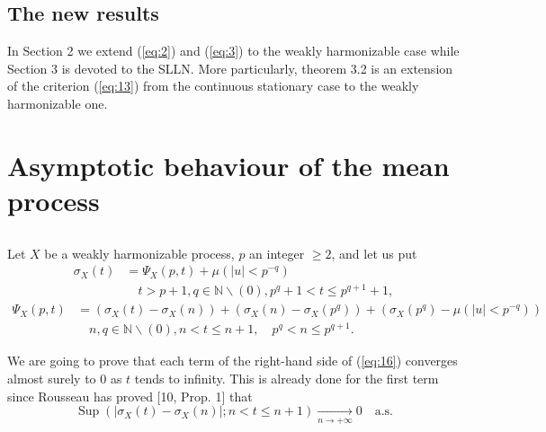 \documentclass{article}
\theoremstyle{definition}
\begin{document}
\subsection{The new results}

In Section 2 we extend (\ref{eq:2}) and (\ref{eq:3}) to the weakly harmonizable case while Section 3 is devoted to the SLLN. More particularly, theorem 3.2 is an extension of the criterion (\ref{eq:13}) from the continuous stationary case to the weakly harmonizable one.

\section{Asymptotic behaviour of the mean process}
\subsection{}

Let $X$ be a weakly harmonizable process, $p$ an integer $\geqslant 2$, and let us put
\begin{equation}\label{eq:15}
\begin{aligned}
\sigma_{X}(t)&=\Psi_{X}(p, t)+\mu\left(|u|<p^{-q}\right) \\
&\quad t>p+1, q \in \mathbb{N} \backslash(0), p^{q}+1<t \leqslant p^{q+1}+1,
\end{aligned}
\end{equation}
\begin{equation}\label{eq:16}
\begin{aligned}
\Psi_{X}(p, t)&=\left(\sigma_{X}(t)-\sigma_{X}(n)\right)+\left(\sigma_{X}(n)-\sigma_{X}\left(p^{q}\right)\right)+\left(\sigma_{X}\left(p^{q}\right)-\mu\left(|u|<p^{-q}\right)\right) \\
&\quad n, q \in \mathbb{N} \backslash(0), n<t \leqslant n+1, \quad p^{q}<n \leqslant p^{q+1}.
\end{aligned}
\end{equation}

We are going to prove that each term of the right-hand side of (\ref{eq:16}) converges almost surely to 0 as $t$ tends to infinity. This is already done for the first term since Rousseau has proved [10, Prop. 1] that
\begin{equation}\label{eq:17}
\operatorname{Sup}\left(\left|\sigma_{X}(t)-\sigma_{X}(n)\right| ; n<t \leqslant n+1\right) \underset{n \rightarrow+\infty}{\longrightarrow} 0 \quad \text{a.s.}
\end{equation}
\end{document}
